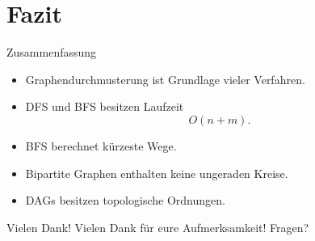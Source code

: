 \documentclass{beamer}
\begin{document}
\section{Fazit}
\begin{frame}{Zusammenfassung}
\begin{itemize}
    \item Graphendurchmusterung ist Grundlage vieler Verfahren.
    \item DFS und BFS besitzen Laufzeit
    \[O(n+m).\]
    \item BFS berechnet kürzeste Wege.
    \item Bipartite Graphen enthalten keine ungeraden Kreise.
    \item DAGs besitzen topologische Ordnungen.
\end{itemize}
\end{frame}
\begin{frame}{Vielen Dank!}
Vielen Dank für eure Aufmerksamkeit!
\vspace{1cm}
Fragen?
\end{frame}
\end{document}
